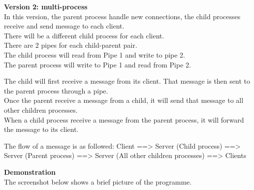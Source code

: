 \documentclass{article}
\begin{document}
\textbf{Version 2: multi-process}\\
In this version, the parent process handle new connections, the child processes receive and send message to each client.\\
There will be a different child process for each client.\\
There are 2 pipes for each child-parent pair.\\
The child process will read from Pipe 1 and write to pipe 2.\\
The parent process will write to Pipe 1 and read from Pipe 2.

The child will first receive a message from its client. That message is then sent to the parent process through a pipe.\\
Once the parent receive a message from a child, it will send that message to all other children processes.\\
When a child process receive a message from the parent process, it will forward the message to its client.

The flow of a message is as followed: Client ==> Server (Child process) ==> Server (Parent process) ==> Server (All other children processes) ==> Clients

\textbf{Demonstration}\\
The screenshot below shows a brief picture of the programme.

\begin{center}
\end{center}
\end{document}
